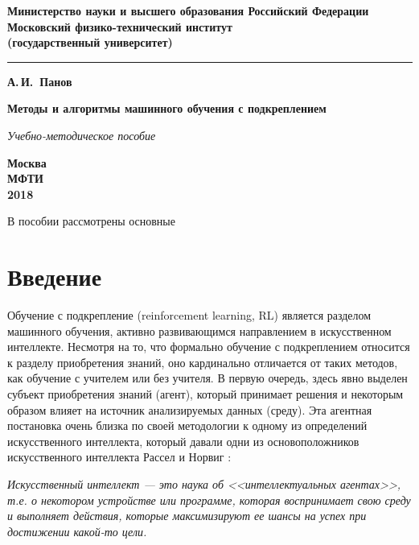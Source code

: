 \documentclass[12pt]{memoir}
\begin{document}
	\pagestyle{empty}
		\begin{center}
			{\bfseries  Министерство науки и высшего образования Российский Федерации \\
				Московский физико-технический институт\\
				(государственный университет)
				
			}

			\vspace{-5pt}
			\noindent\rule{\textwidth}{2pt}
			
			\vspace{50pt}
			{\Large\bfseries А.\,И.~Панов}
			
			\vspace{100pt}
			{\Huge\bfseries Методы и алгоритмы машинного обучения с подкреплением}
			
			\vspace{20pt}
			{\Large\itshape Учебно-методическое пособие}
			
			\vfill
			{\bfseries Москва\\
				МФТИ\\
				2018
			}
		\end{center}

	
	\frontmatter
	
	В пособии рассмотрены основные 
	
	\clearpage
	\tableofcontents %
		
	\mainmatter
	
	\chapter*{Введение}
	Обучение с подкрепление (reinforcement learning, RL) является разделом машинного обучения, активно развивающимся направлением в искусственном интеллекте. Несмотря на то, что формально обучение с подкреплением относится к разделу приобретения знаний, оно кардинально отличается от таких методов, как обучение с учителем или без учителя. В первую очередь, здесь явно выделен субъект приобретения знаний (агент), который принимает решения и некоторым образом влияет на источник анализируемых данных (среду). Эта агентная постановка очень близка по своей методологии к одному из определений искусственного интеллекта, который давали одни из основоположников искусственного интеллекта Рассел и Норвиг \cite{AIBook2006}:
	\begin{displayquote}
		\textit{Искусственный интеллект --- это наука об <<интеллектуальных агентах>>, т.е. о некотором устройстве или программе, которая воспринимает свою среду и выполняет действия, которые максимизируют ее шансы на успех при достижении какой-то цели.}
	\end{displayquote}
\end{document}
